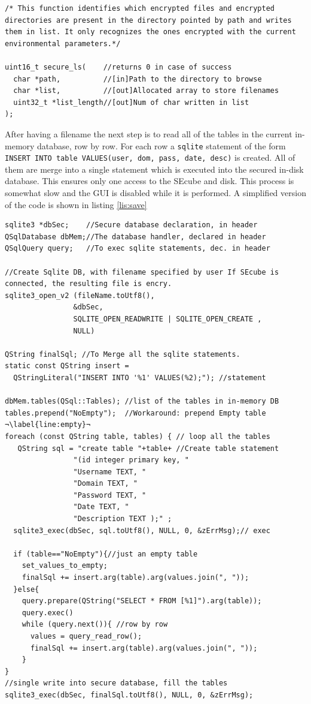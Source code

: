 \begin{lstlisting}[style=customc, float=htb, caption={\texttt{secure\_ls} declaration}, label = {lis:securels}]
 /* This function identifies which encrypted files and encrypted directories are present in the directory pointed by path and writes them in list. It only recognizes the ones encrypted with the current environmental parameters.*/
 
uint16_t secure_ls(    //returns 0 in case of success
  char *path,          //[in]Path to the directory to browse
  char *list,          //[out]Allocated array to store filenames
  uint32_t *list_length//[out]Num of char written in list
);
\end{lstlisting}


After having a filename the next step is to read all of the tables in the current in-memory database, row by row. For each row a \texttt{sqlite} statement of the form \texttt{INSERT INTO table VALUES(user, dom, pass, date, desc)} is created. All of them are merge into a single statement which is executed into the secured in-disk database. This ensures only one access to the SEcube and disk. This process is somewhat slow and the GUI is disabled while it is performed. A simplified version of the code is shown in listing \ref{lis:save} 

\begin{lstlisting}[style=customc, float=htb, caption={simplified Save process}, label = {lis:save}, escapechar=¬]
sqlite3 *dbSec;    //Secure database declaration, in header
QSqlDatabase dbMem;//The database handler, declared in header 
QSqlQuery query;   //To exec sqlite statements, dec. in header

//Create Sqlite DB, with filename specified by user If SEcube is connected, the resulting file is encry.
sqlite3_open_v2 (fileName.toUtf8(),   
                &dbSec, 
                SQLITE_OPEN_READWRITE | SQLITE_OPEN_CREATE , 
                NULL) 
                
QString finalSql; //To Merge all the sqlite statements.
static const QString insert = 
  QStringLiteral("INSERT INTO '%1' VALUES(%2);"); //statement
  
dbMem.tables(QSql::Tables); //list of the tables in in-memory DB
tables.prepend("NoEmpty");  //Workaround: prepend Empty table   ¬\label{line:empty}¬
foreach (const QString table, tables) { // loop all the tables
   QString sql = "create table "+table+ //Create table statement 
                "(id integer primary key, "
                "Username TEXT, "
                "Domain TEXT, "
                "Password TEXT, "
                "Date TEXT, "
                "Description TEXT );" ; 
  sqlite3_exec(dbSec, sql.toUtf8(), NULL, 0, &zErrMsg);// exec
  
  if (table=="NoEmpty"){//just an empty table
    set_values_to_empty;
    finalSql += insert.arg(table).arg(values.join(", "));
  }else{
    query.prepare(QString("SELECT * FROM [%1]").arg(table));
    query.exec()
    while (query.next()){ //row by row
      values = query_read_row();
      finalSql += insert.arg(table).arg(values.join(", "));
    }
}
//single write into secure database, fill the tables
sqlite3_exec(dbSec, finalSql.toUtf8(), NULL, 0, &zErrMsg);
\end{lstlisting}

